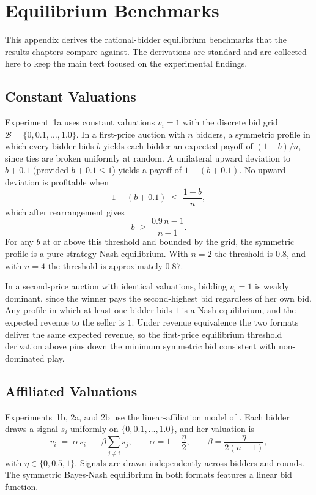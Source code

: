 \chapter{Equilibrium Benchmarks}
\label{ch:equilibria}

This appendix derives the rational-bidder equilibrium benchmarks that the results chapters compare against. The derivations are standard and are collected here to keep the main text focused on the experimental findings.

\section{Constant Valuations}
\label{sec:eq_constant}

Experiment~1a uses constant valuations $v_i = 1$ with the discrete bid grid $\mathcal{B} = \{0, 0.1, \ldots, 1.0\}$. In a first-price auction with $n$ bidders, a symmetric profile in which every bidder bids $b$ yields each bidder an expected payoff of $(1 - b) / n$, since ties are broken uniformly at random. A unilateral upward deviation to $b + 0.1$ (provided $b + 0.1 \leq 1$) yields a payoff of $1 - (b + 0.1)$. No upward deviation is profitable when
\[
1 - (b + 0.1) \;\leq\; \frac{1 - b}{n},
\]
which after rearrangement gives
\[
b \;\geq\; \frac{0.9\,n - 1}{n - 1}.
\]
For any $b$ at or above this threshold and bounded by the grid, the symmetric profile is a pure-strategy Nash equilibrium. With $n = 2$ the threshold is $0.8$, and with $n = 4$ the threshold is approximately $0.87$.

In a second-price auction with identical valuations, bidding $v_i = 1$ is weakly dominant, since the winner pays the second-highest bid regardless of her own bid. Any profile in which at least one bidder bids $1$ is a Nash equilibrium, and the expected revenue to the seller is $1$. Under revenue equivalence \citep{Vickrey1961} the two formats deliver the same expected revenue, so the first-price equilibrium threshold derivation above pins down the minimum symmetric bid consistent with non-dominated play.

\section{Affiliated Valuations}
\label{sec:eq_affiliated}

Experiments~1b, 2a, and 2b use the linear-affiliation model of . Each bidder draws a signal $s_i$ uniformly on $\{0, 0.1, \ldots, 1.0\}$, and her valuation is
\[
v_i \;=\; \alpha \, s_i \;+\; \beta \sum_{j \neq i} s_j,
\qquad
\alpha = 1 - \frac{\eta}{2},
\qquad
\beta = \frac{\eta}{2 (n - 1)},
\]
with $\eta \in \{0, 0.5, 1\}$. Signals are drawn independently across bidders and rounds. The symmetric Bayes-Nash equilibrium in both formats features a linear bid function.

